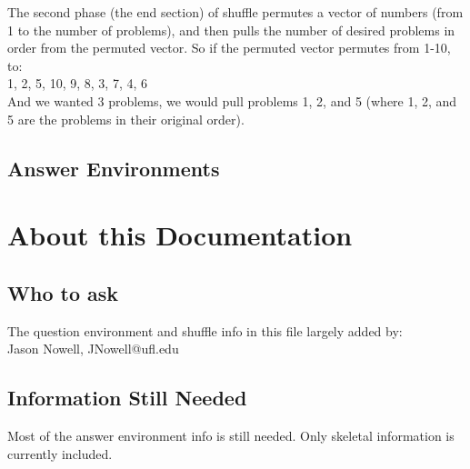 \documentclass{ximera}
\begin{document}
The second phase (the end section) of shuffle permutes a vector of numbers (from 1 to the number of problems), and then pulls the number of desired problems in order from the permuted vector. So if the permuted vector permutes from 1-10, to:\\
1, 2, 5, 10, 9, 8, 3, 7, 4, 6\\
And we wanted 3 problems, we would pull problems 1, 2, and 5 (where 1, 2, and 5 are the problems in their original order).

\subsection{Answer Environments}


\section{About this Documentation}
\subsection{Who to ask}
The question environment and shuffle info in this file largely added by:\\
Jason Nowell, JNowell@ufl.edu\\


\subsection{Information Still Needed}
Most of the answer environment info is still needed. Only skeletal information is currently included.
\end{document}
